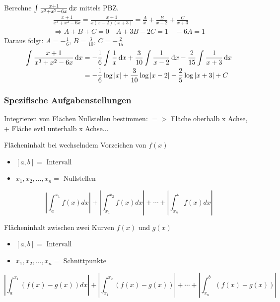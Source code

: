 \begin{example}
	Berechne $\int \frac{x+1}{x^3 + x^2 - 6x} \dif x$ mittels PBZ.
	\begin{gather*}
		\frac{x+1}{x^3 + x^2 - 6x} = \frac{x+1}{x(x-2)(x+3)} = \frac{A}{x} + \frac{B}{x-2} + \frac{C}{x+3}\\
		\Rightarrow A + B + C = 0 \quad A + 3B - 2C = 1 \quad -6A = 1
	\end{gather*}
	Daraus folgt: $A = -\frac{1}{6}$, $B = \frac{3}{10}$, $C = -\frac{2}{15}$
	\begin{align*}
		\int \frac{x+1}{x^3 + x^2 - 6x} \dif x &= -\frac{1}{6} \int \frac{1}{x} \dif x + \frac{3}{10} \int \frac{1}{x-2} \dif x - \frac{2}{15} \int \frac{1}{x+3} \dif x\\
						       &= -\frac{1}{6} \log |x| + \frac{3}{10} \log |x-2| - \frac{2}{5} \log |x+3| + C 
	\end{align*}
\end{example}






\subsubsection*{Spezifische Aufgabenstellungen}

\begin{KR}{Integrieren von Flächen}
    Nullstellen bestimmen: $=>$ Fläche oberhalb $\mathrm{x}$ Achse, + Fläche evtl unterhalb x Achse...
    \end{KR}

\begin{KR}{Flächeninhalt bei wechselndem Vorzeichen von $f(x)$}\\
	\begin{itemize}
	  \item $[a, b]=$ Intervall
	  \item $x_{1}, x_{2}, \ldots, x_{n}=$ Nullstellen
	\end{itemize}
	
	$$\left|\int_{a}^{x_{1}} f(x) d x\right|+\left|\int_{x_{1}}^{x_{2}} f(x) d x\right|+\cdots+\left|\int_{x_{n}}^{b} f(x) d x\right|$$
	\end{KR}

	\begin{KR}{Flächeninhalt zwischen zwei Kurven $f(x)$ und $g(x)$}\\
		\begin{itemize}
		  \item $[a, b]=$ Intervall
		  \item $x_{1}, x_{2}, \ldots, x_{n}=$ Schnittpunkte
		\end{itemize}
		$$\left|\int_{a}^{x_{1}}(f(x)-g(x)) d x\right|+\left|\int_{x_{1}}^{x_{2}}(f(x)-g(x))\right|+\cdots+\left|\int_{x_{n}}^{b}(f(x)-g(x))\right|$$
		\end{KR}


